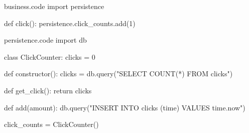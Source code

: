 \documentclass{slide}
\begin{document}
\begin{frame}[fragile]
\begin{code}[style=python]{business.code}
import persistence

def click():
    persistence.click_counts.add(1)
\end{code}
\end{frame}

\begin{frame}[fragile]
\small
\begin{code}[style=python,captionpos=t]{persistence.code}
import db

class ClickCounter:
    clicks = 0

    def constructor():
        clicks = db.query("SELECT COUNT(*) FROM clicks")

    def get_click():
        return clicks

    def add(amount):
        db.query("INSERT INTO clicks (time) VALUES {{time.now}}")

click_counts = ClickCounter()
\end{code}
\end{frame}



\end{document}
